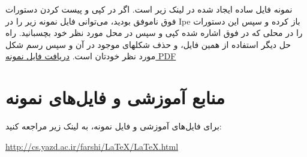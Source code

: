 \baselineskip=1cm

نمونه فایل ساده ایجاد شده در لینک زیر است.
اگر در کپی و پیست کردن دستورات فوق ناموفق بودید، می‌توانی فایل نمونه زیر را در
Ipe باز کرده و سپس این دستورات را در محلی که در فوق اشاره شده کپی و سپس در محل
مورد نظر خود بچسبانید. راه حل دیگر استفاده از همین فایل، و حذف شکلهای موجود در آن و سپس
رسم شکل مورد نظر خودتان است.
\href{http://bayanbox.ir/id/8287021624570840892?info}{دریافت فایل نمونه PDF}
\section{منابع آموزشی و فایل‌های نمونه}
برای فایل‌های آموزشی و فایل نمونه، به لینک زیر مراجعه کنید:

\url{http://cs.yazd.ac.ir/farshi/LaTeX/LaTeX.html}


